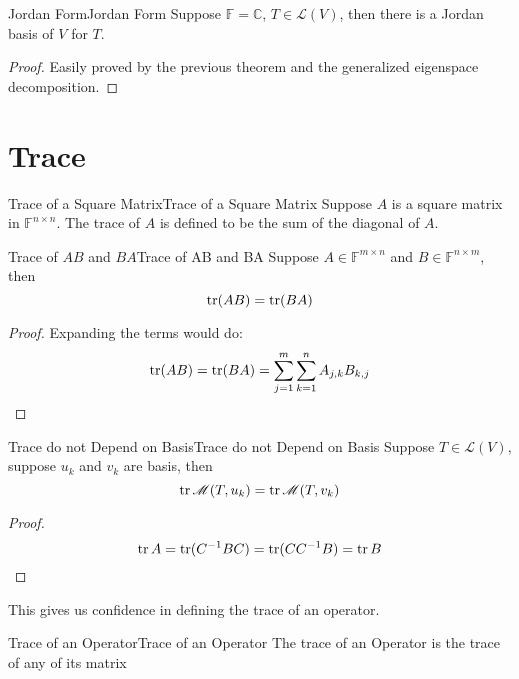 \documentclass[../main.tex]{subfiles}
\begin{document}
\begin{theorem}{Jordan Form}{Jordan Form}
Suppose $\mathbb{F}=\mathbb{C}$, $T\in \mathscr{L}(V)$, then there is a Jordan basis of $V$ for $T$.
\end{theorem}
\begin{proof}
Easily proved by the previous theorem and the generalized eigenspace decomposition.
\end{proof}

\section{Trace}
\begin{definition}{Trace of a Square Matrix}{Trace of a Square Matrix}
Suppose $A$ is a square matrix in $\mathbb{F}^{n \times n}$. The trace of $A$ is defined to be the sum of the diagonal of $A$.
\end{definition}

\begin{theorem}{Trace of $AB$ and $BA$}{Trace of AB and BA}
Suppose $A\in \mathbb{F}^{m \times n}$ and $B\in \mathbb{F}^{n \times m}$, then
\begin{equation*}
\operatorname{tr} (AB) = \operatorname{tr}(BA)
\end{equation*}
\end{theorem}
\begin{proof}
Expanding the terms would do:
\begin{equation*}
\operatorname{tr}(AB) = \operatorname{tr}(BA) = \sum_{j=1}^{m} \sum_{k=1}^{n} A_{j,k}B_{k,j}
\end{equation*}
\end{proof}

\begin{theorem}{Trace do not Depend on Basis}{Trace do not Depend on Basis}
Suppose $T\in \mathscr{L}(V)$, suppose $u_k$ and $v_k$ are basis, then
\begin{equation*}
\operatorname{tr} \mathscr{M}(T,u_k) = \operatorname{tr} \mathscr{M}(T,v_k)
\end{equation*}
\end{theorem}
\begin{proof}
\begin{equation*}
\operatorname{tr} A  = \operatorname{tr} (C ^{-1}BC) = \operatorname{tr} (C C ^{-1}B) = \operatorname{tr} B
\end{equation*}
\end{proof}
This gives us confidence in defining the trace of an operator.

\begin{definition}{Trace of an Operator}{Trace of an Operator}
The trace of an Operator is the trace of any of its matrix
\end{definition}
\end{document}

